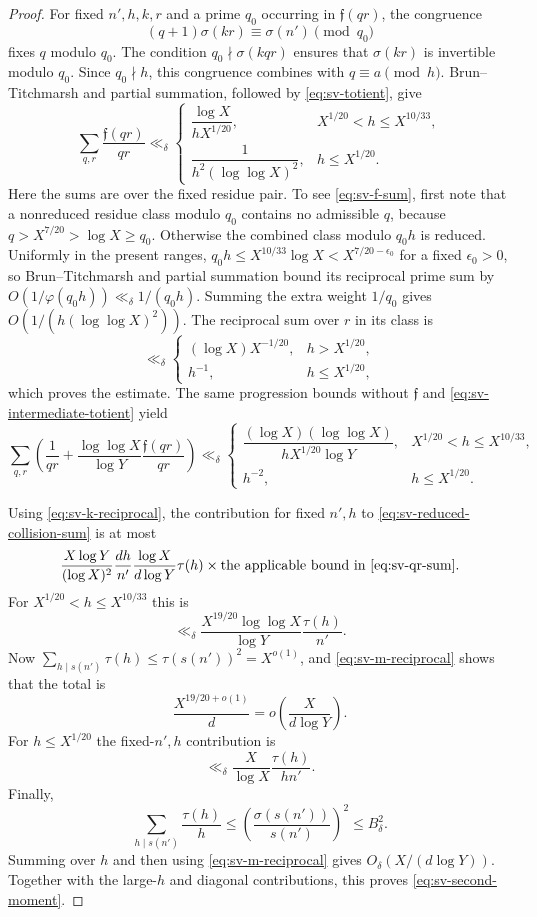\documentclass[11pt,letterpaper,reqno]{amsart}
\numberwithin{equation}{section}
\theoremstyle{remark}
\renewcommand{\leq}{\leqslant}
\renewcommand{\geq}{\geqslant}
\begin{document}
\begin{proof}
For fixed $n',h,k,r$ and a prime $q_0$ occurring in
$\mathfrak{f}(qr)$, the congruence
\[
 (q+1)\sigma(kr)\equiv\sigma(n')\pmod{q_0}
\]
fixes $q$ modulo $q_0$. The condition
$q_0\nmid\sigma(kqr)$ ensures that $\sigma(kr)$ is invertible modulo
$q_0$. Since $q_0\nmid h$, this congruence combines with
$q\equiv a\pmod h$. Brun--Titchmarsh and partial summation, followed by
\eqref{eq:sv-totient}, give
\begin{equation}\label{eq:sv-f-sum}
 \sum_{q,r}\frac{\mathfrak{f}(qr)}{qr}
 \ll_\delta
 \begin{cases}
 \dfrac{\log X}{hX^{1/20}},&X^{1/20}<h\leq X^{10/33},\\[6pt]
 \dfrac{1}{h^2(\log\log X)^2},&h\leq X^{1/20}.
 \end{cases}
\end{equation}
Here the sums are over the fixed residue pair. To see
\eqref{eq:sv-f-sum}, first note that a nonreduced residue class modulo
$q_0$ contains no admissible $q$, because $q>X^{7/20}>\log X\geq q_0$.
Otherwise the combined class modulo $q_0 h$ is reduced. Uniformly in
the present ranges,
$q_0 h\leq X^{10/33}\log X<X^{7/20-\epsilon_0}$ for a fixed
$\epsilon_0>0$, so Brun--Titchmarsh and partial summation bound its
reciprocal prime sum by
$O(1/\varphi(q_0 h))\ll_\delta1/(q_0 h)$. Summing the extra weight
$1/q_0$ gives $O(1/(h(\log\log X)^2))$. The reciprocal sum over $r$ in its
class is
\[
 \ll_\delta
 \begin{cases}
 (\log X)X^{-1/20},&h>X^{1/20},\\
 h^{-1},&h\leq X^{1/20},
 \end{cases}
\]
which proves the estimate. The same progression bounds without
$\mathfrak{f}$ and \eqref{eq:sv-intermediate-totient} yield
\begin{equation}\label{eq:sv-qr-sum}
 \sum_{q,r}\left(\frac1{qr}
 +\frac{\log\log X}{\log Y}\frac{\mathfrak{f}(qr)}{qr}\right)
 \ll_\delta
 \begin{cases}
 \dfrac{(\log X)(\log\log X)}{hX^{1/20}\log Y},
 &X^{1/20}<h\leq X^{10/33},\\[6pt]
 h^{-2},&h\leq X^{1/20}.
 \end{cases}
\end{equation}

Using \eqref{eq:sv-k-reciprocal}, the contribution for fixed $n',h$ to
\eqref{eq:sv-reduced-collision-sum} is at most
\[
 \frac{X\log Y}{(\log X)^2}\frac{dh}{n'}
 \frac{\log X}{d\log Y}\tau(h)
 \times\text{the applicable bound in \eqref{eq:sv-qr-sum}}.
\]
For $X^{1/20}<h\leq X^{10/33}$ this is
\[
 \ll_\delta
 \frac{X^{19/20}\log\log X}{\log Y}\frac{\tau(h)}{n'}.
\]
Now $\sum_{h\mid s(n')}\tau(h)\leq\tau(s(n'))^2=X^{o(1)}$, and
\eqref{eq:sv-m-reciprocal} shows that the total is
\[
 \frac{X^{19/20+o(1)}}d
 =o\!\left(\frac{X}{d\log Y}\right).
\]
For $h\leq X^{1/20}$ the fixed-$n',h$ contribution is
\[
 \ll_\delta\frac{X}{\log X}\frac{\tau(h)}{hn'}.
\]
Finally,
\[
 \sum_{h\mid s(n')}\frac{\tau(h)}h
 \leq\left(\frac{\sigma(s(n'))}{s(n')}\right)^2
 \leq B_\delta^2.
\]
Summing over $h$ and then using \eqref{eq:sv-m-reciprocal} gives
$O_\delta(X/(d\log Y))$. Together with the large-$h$ and diagonal
contributions, this proves \eqref{eq:sv-second-moment}.
\end{proof}
\end{document}
